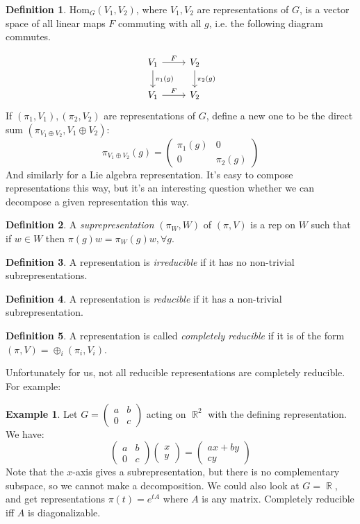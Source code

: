 \documentclass[12 pt]{article}
\DeclareMathOperator {\R} {\mathbb{R}}
\theoremstyle{plain}
\theoremstyle{definition}
\newtheorem{defn}{Definition}
\newtheorem{exmp}{Example}
\theoremstyle{remark}
\begin{document}
\begin{defn}
Hom$_G (V_1, V_2)$, where $V_1, V_2$ are representations of $G$, is a vector space of all linear maps $F$ commuting with all $g$, i.e. the following diagram commutes.
\end{defn}
\[
\begin{tikzcd}
V_1\arrow{r}{F}\arrow{d}{\pi_1(g)} & V_2\arrow{d}{\pi_2(g)} \\ 
V_1\arrow{r}{F} & V_2
\end{tikzcd}
\]
If $(\pi_1, V_1) , (\pi_2, V_2)$ are representations of $G$, define a new one to be the direct sum $(\pi_{V_1 \oplus V_2}, V_1 \oplus V_2)$:
\[     \pi_{V_1 \oplus V_2} (g) = \left(  \begin{array} {cc}  \pi_1(g) & 0 \\ 0 & \pi_2(g)  \end{array} \right)   \]
And similarly for a Lie algebra representation. It's easy to compose representations this way, but it's an interesting question whether we can decompose a given representation this way.
\begin{defn}
A \emph{suprepresentation} $(\pi_W, W)$ of $(\pi, V)$ is a rep on $W$ such that if $w\in W$ then $\pi(g) w = \pi_W (g) w, \forall g$.
\end{defn}
\begin{defn}
A representation is \emph{irreducible} if it has no non-trivial subrepresentations.
\end{defn}
\begin{defn}
A representation is \emph{reducible} if it has a non-trivial subrepresentation.
\end{defn}
\begin{defn}
A representation is called \emph{completely reducible} if it is of the form $(\pi , V) = \oplus_i (\pi_i, V_i)$.
\end{defn}
Unfortunately for us, not all reducible representations are completely reducible. For example:

\begin{exmp}
Let $G = \left( \begin{array} {cc} a & b \\ 0 & c \end{array} \right)$ acting on $\R^2$ with the defining representation. We have:
\[   \left( \begin{array} {cc} a & b \\ 0 & c \end{array} \right) \left( \begin{array} {c} x \\ y \end{array} \right) = \left( \begin{array} {c} ax+by \\ cy \end{array} \right)    \]
Note that the $x$-axis gives a subrepresentation, but there is no complementary subspace, so we cannot make a decomposition. We could also look at $G = \R$, and get representations $\pi(t) = e^{tA}$ where $A$ is any matrix. Completely reducible iff $A$ is diagonalizable.
\end{exmp}
\end{document}
